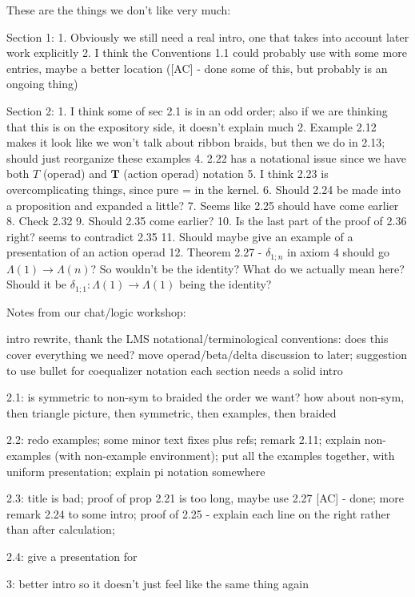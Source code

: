 These are the things we don't like very much:

Section 1:
1. Obviously we still need a real intro, one that takes into account later work explicitly
2. I think the Conventions 1.1 could probably use with some more entries, maybe a better location ([AC] - done some of this, but probably is an ongoing thing)

Section 2:
1. I think some of sec 2.1 is in an odd order; also if we are thinking that this is on the expository side, it doesn't explain much
2. Example 2.12 makes it look like we won't talk about ribbon braids, but then we do in 2.13; should just reorganize these examples
4. 2.22 has a notational issue since we have both $T$ (operad) and $\mathbf{T}$ (action operad) notation
5. I think 2.23 is overcomplicating things, since pure = in the kernel.
6. Should 2.24 be made into a proposition and expanded a little?
7. Seems like 2.25 should have come earlier
8. Check 2.32
9. Should 2.35 come earlier?
10. Is the last part of the proof of 2.36 right? seems to contradict 2.35
11. Should maybe give an example of a presentation of an action operad 
12. Theorem 2.27 - $\delta_{1;n}$ in axiom 4 should go $\Lambda(1) \rightarrow \Lambda(n)$? So wouldn't be the identity? What do we actually mean here? Should it be $\delta_{1;1} \colon \Lambda(1) \rightarrow \Lambda(1)$ being the identity?


Notes from our chat/logic workshop:

intro rewrite, thank the LMS 
notational/terminological conventions: does this cover everything we need? move operad/beta/delta discussion to later; suggestion to use bullet for coequalizer notation
each section needs a solid intro

2.1: is symmetric to non-sym to braided the order we want? how about non-sym, then triangle picture, then symmetric, then examples, then braided

2.2: redo examples; some minor text fixes plus refs; remark 2.11; explain non-examples (with non-example environment); put all the examples together, with uniform presentation; explain pi notation somewhere

2.3: title is bad;
proof of prop 2.21 is too long, maybe use 2.27 [AC] - done;
more remark 2.24 to some intro;
proof of 2.25 - explain each line on the right rather than after calculation; 

2.4: give a presentation for \Sigma [NG]

3: better intro so it doesn't just feel like the same thing again

